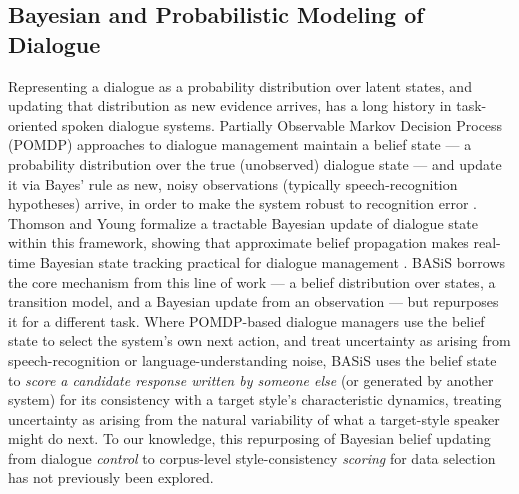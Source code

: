 \documentclass[manuscript,review,anonymous]{acmart}
\begin{document}
\subsection{Bayesian and Probabilistic Modeling of Dialogue}
Representing a dialogue as a probability distribution over latent states, and updating that distribution as new evidence arrives, has a long history in task-oriented spoken dialogue systems. Partially Observable Markov Decision Process (POMDP) approaches to dialogue management maintain a belief state --- a probability distribution over the true (unobserved) dialogue state --- and update it via Bayes' rule as new, noisy observations (typically speech-recognition hypotheses) arrive, in order to make the system robust to recognition error \cite{young2013pomdp}. Thomson and Young formalize a tractable Bayesian update of dialogue state within this framework, showing that approximate belief propagation makes real-time Bayesian state tracking practical for dialogue management \cite{thomson2010bayesian}. BASiS borrows the core mechanism from this line of work --- a belief distribution over states, a transition model, and a Bayesian update from an observation --- but repurposes it for a different task. Where POMDP-based dialogue managers use the belief state to select the system's own next action, and treat uncertainty as arising from speech-recognition or language-understanding noise, BASiS uses the belief state to \emph{score a candidate response written by someone else} (or generated by another system) for its consistency with a target style's characteristic dynamics, treating uncertainty as arising from the natural variability of what a target-style speaker might do next. To our knowledge, this repurposing of Bayesian belief updating from dialogue \emph{control} to corpus-level style-consistency \emph{scoring} for data selection has not previously been explored.
\end{document}
